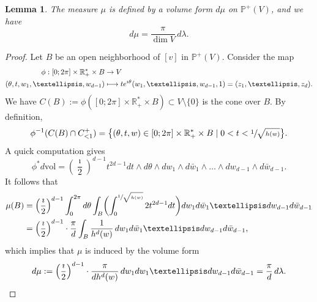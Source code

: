 \documentclass[11pt]{article}
\numberwithin{equation}{section}
\newcommand\mto{\mathchoice{\longmapsto}{\mapsto}{\mapsto}{\mapsto}}
\theoremstyle{plain}
\newtheorem{Lemma}[Theorem]{Lemma}
\theoremstyle{definition}
\newcommand{\R}{\mathbb{R}}
\newcommand{\Pb}{\mathbb{P}}
\newcommand{\vol}{\mathrm{vol}}
\begin{document}
\begin{Lemma}\label{lm:pushed:vol:form}
The measure $\mu$ is defined by a volume form $d\mu$ on $\Pb^+(V)$, and we have
\[
d\mu=\frac{\pi}{\dim V}\,d\lambda.
\]
\end{Lemma}
\begin{proof}
Let $B$ be an open neighborhood of $[v]$ in $\Pb^+(V)$. Consider the map
\begin{align*}
\phi: [0;2\pi]\times\R_+^*\times B & \to V\\
 (\theta,t,w_1,\dots,w_{d-1}) & \mto te^{\imath\theta}(w_1,\dots,w_{d-1},1)=(z_1,\dots,z_d).
\end{align*}
We have $C(B):=\phi([0;2\pi]\times\R^*_+\times B)\subset V\setminus\{0\}$ is the cone over $B$. By definition,
\[
\phi^{-1}(C(B)\cap C^+_{<1})=\bigl\{(\theta,t,w) \in [0;2\pi]\times\R_+^*\times B\mid 0< t < \sfrac{1}{\sqrt{h(w)}}\bigr\}.
\]
A quick computation gives
\[
\phi^*d\vol=\left(\frac{\imath}{2}\right)^{d-1} t^{2d-1}dt\wedge d\theta\wedge dw_1\wedge d\bar{w}_1\wedge\dots\wedge dw_{d-1}\wedge d\bar{w}_{d-1}.
\]
It follows that
\begin{align*}
\mu(B)&= \left(\frac{\imath}{2}\right)^{d-1} \int_0^{2\pi}d\theta \int_B \biggl(\int_0^{\sfrac{1}{\sqrt{h(w)}}} 2t^{2d-1}dt\biggr) dw_1d\bar{w}_1\dots dw_{d-1}d\bar{w}_{d-1}\\
&= \left(\frac{\imath}{2}\right)^{d-1}\cdot\frac{\pi}{d}\int_B \frac{1}{h^{d}(w)}\,dw_1d\bar{w}_1\dots dw_{d-1}d\bar{w}_{d-1},
\end{align*}
which implies that $\mu$ is induced by the volume form
\[
d\mu:=\left(\frac{\imath}{2}\right)^{d-1}\cdot\frac{\pi}{dh^d(w)}\,dw_1dw_1\dots dw_{d-1}d\bar{w}_{d-1}=\frac{\pi}{d}\,d\lambda.\qedhere
\]
\end{proof}
\end{document}
